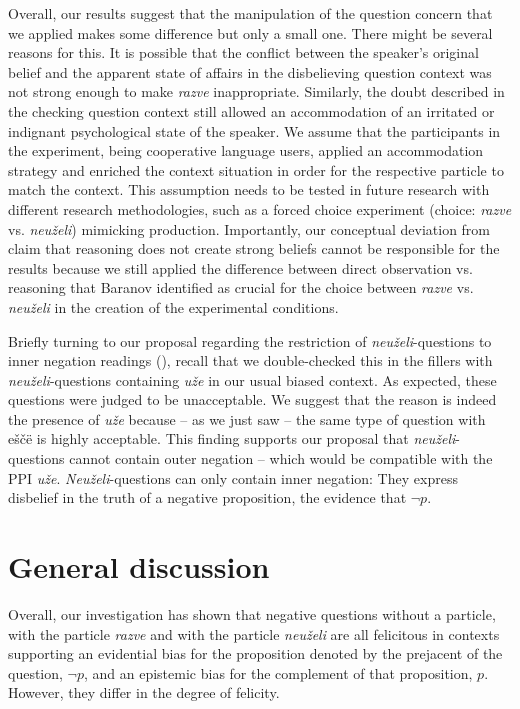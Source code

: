 \documentclass[output=paper,colorlinks,citecolor=brown]{langscibook}
\begin{document}
Overall, our results suggest that the manipulation of the question concern that we applied makes some difference but only a small one. There might be several reasons for this. It is possible that the conflict between the speaker's original belief and the apparent state of affairs in the disbelieving question context was not strong enough to make \textit{razve} inappropriate. Similarly, the doubt described in the checking question context still allowed an accommodation of an irritated or indignant psychological state of the speaker. We assume that the participants in the experiment, being cooperative language users, applied an accommodation strategy and enriched the context situation in order for the respective particle to match the context. This assumption needs to be tested in future research with different research methodologies, such as a forced choice experiment (choice: \textit{razve} vs. \textit{neuželi}) mimicking production. Importantly, our conceptual deviation from  claim that reasoning does not create strong beliefs cannot be responsible for the results because we still applied the difference between direct observation vs. reasoning that Baranov identified as crucial for the choice between \textit{razve} vs. \textit{neuželi} in the creation of the experimental conditions.

Briefly turning to our proposal regarding the restriction of \textit{neuželi}-questions to inner negation readings (), recall that we double-checked this in the fillers with \textit{neuželi}-questions containing \textit{uže} in our usual biased context. As expected, these questions were judged to be unacceptable. We suggest that the reason is indeed the presence of \textit{uže} because – as we just saw – the same type of question with eščë is highly acceptable. This finding supports our proposal that \textit{neuželi}-questions cannot contain outer negation – which would be compatible with the PPI \textit{uže}. \textit{Neuželi}-questions can only contain inner negation: They express disbelief in the truth of a negative proposition, the evidence that $\neg p$.

\section{General discussion}\label{sec:05:6}

Overall, our investigation has shown that negative questions without a particle, with the particle \textit{razve} and with the particle \textit{neuželi} are all felicitous in contexts supporting an evidential bias for the proposition denoted by the prejacent of the question, $\neg p$, and an epistemic bias for the complement of that proposition, $p$. However, they differ in the degree of felicity. 
\end{document}
